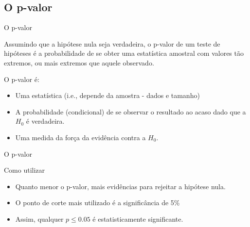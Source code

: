 \documentclass{beamer}
\begin{document}
\subsection{O p-valor}

\begin{frame}{O p-valor}
  \begin{definition}
    Assumindo que a hipótese nula seja verdadeira, o \alert{p-valor}
    de um teste de hipóteses é a probabilidade de se obter uma
    estatística amostral com valores tão extremos, ou mais extremos
    que aquele observado.
  \end{definition}

O p-valor \alert{é}:
  \begin{itemize}
  \item Uma estatística (i.e., depende da amostra - dados e tamanho)
  \item A probabilidade (condicional) de se observar o resultado ao
    acaso \alert{dado que} a $H_0$ é verdadeira.
  \item Uma medida da força da evidência contra a $H_0$.
  \end{itemize}
\end{frame}

\begin{frame}{O p-valor}
  \begin{block}{Como utilizar}
    \begin{itemize}
    \item Quanto menor o p-valor, mais evidências para rejeitar a
      hipótese nula.
    \item O ponto de corte mais utilizado é a significância de 5\%
    \item Assim, qualquer $p \le 0.05$ é estatisticamente significante.
    \end{itemize}
  \end{block}
\end{frame}


\end{document}
